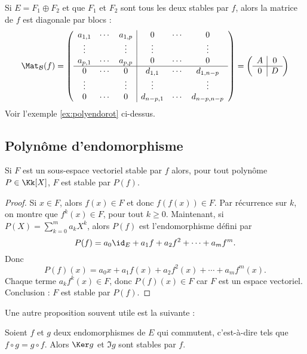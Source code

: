 \documentclass[12pt, class=report,crop=false]{standalone}
\begin{document}
\begin{remarque*}
Si $E = F_1 \oplus F_2$ et que $F_1$ et $F_2$ sont tous les deux stables par $f$,
alors la matrice de $f$ est diagonale par blocs :
\[\Mat_{\mathcal{B}}(f) = 
\left(\begin{array}{ccc|ccc}
a_{1,1}&\cdots&a_{1,p}&0&\cdots&0\\
\vdots&&\vdots&\vdots&&\vdots\\
a_{p,1}&\cdots&a_{p,p}&0&\cdots&0\\ \hline
0&\cdots&0&d_{1,1}&\cdots&d_{1,n-p}\\
\vdots&&\vdots&\vdots&&\vdots\\
0&\cdots&0&d_{n-p,1}&\cdots&d_{n-p,n-p}
\end{array}\right)
=
\left(\begin{array}{c|c}
A & 0\\ \hline
0 & D\\
\end{array}\right)
\]
Voir l'exemple \ref{ex:polyendorot} ci-dessus.
\end{remarque*}



\subsection{Polynôme d'endomorphisme}


\begin{lemme}
Si $F$ est un sous-espace vectoriel stable par $f$ alors, pour tout polynôme $P \in \Kk[X]$, $F$ est stable par $P(f)$.
\end{lemme} 

\begin{proof}
Si $x \in F$, alors $f(x) \in F$ et donc $f(f(x)) \in F$. 
Par récurrence sur $k$, on montre que $f^{k}(x)\in F$, pour tout $k\ge0$.
Maintenant, si $P(X)=\sum_{k=0}^m a_k X^k$, alors
$P(f)$ est l'endomorphisme défini par
$$P(f)=a_0 \id_E+a_1 f+a_2 f^2+\cdots+a_m f^m.$$
Donc 
$$P(f)(x)=a_0 x+a_1 f(x)+a_2 f^2(x)+\cdots+a_m f^m(x).$$
Chaque terme $a_k f^k(x) \in F$, donc $P(f)(x) \in F$ car $F$ est un espace vectoriel.
Conclusion : $F$ est stable par $P(f)$.
\end{proof}

\bigskip


Une autre proposition souvent utile est la suivante :

\begin{proposition}
Soient $f$ et $g$ deux endomorphismes de $E$ qui commutent, c'est-à-dire tels que $f \circ g=g \circ f$. Alors $\Ker g$ et $\Im g$ sont stables par $f$.
\end{proposition} 
\end{document}
